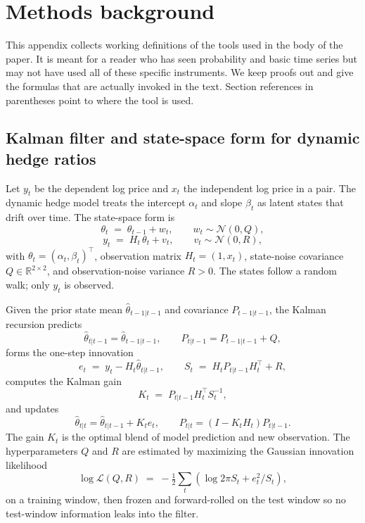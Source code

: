 \documentclass[11pt]{article}
\begin{document}
\appendix

\section{Methods background}
\label{sec:appendix}

This appendix collects working definitions of the tools used in the body of the paper. It
is meant for a reader who has seen probability and basic time series but may not have used
all of these specific instruments. We keep proofs out and give the formulas that are
actually invoked in the text. Section references in parentheses point to where the tool is
used.

\subsection{Kalman filter and state-space form for dynamic hedge ratios}
\label{app:kalman}

Let $y_t$ be the dependent log price and $x_t$ the independent log price in a pair. The
dynamic hedge model treats the intercept $\alpha_t$ and slope $\beta_t$ as latent states
that drift over time. The state-space form is
\[
\theta_t \;=\; \theta_{t-1} + w_t, \qquad w_t \sim \mathcal{N}(0, Q),
\]
\[
y_t \;=\; H_t \, \theta_t + v_t, \qquad v_t \sim \mathcal{N}(0, R),
\]
with $\theta_t = (\alpha_t, \beta_t)^\top$, observation matrix $H_t = (1, x_t)$, state-noise
covariance $Q \in \mathbb{R}^{2\times 2}$, and observation-noise variance $R > 0$. The
states follow a random walk; only $y_t$ is observed.

Given the prior state mean $\hat{\theta}_{t-1|t-1}$ and covariance $P_{t-1|t-1}$, the
Kalman recursion predicts
\[
\hat{\theta}_{t|t-1} = \hat{\theta}_{t-1|t-1}, \qquad P_{t|t-1} = P_{t-1|t-1} + Q,
\]
forms the one-step innovation
\[
e_t \;=\; y_t - H_t \hat{\theta}_{t|t-1}, \qquad S_t \;=\; H_t P_{t|t-1} H_t^\top + R,
\]
computes the Kalman gain
\[
K_t \;=\; P_{t|t-1} H_t^\top S_t^{-1},
\]
and updates
\[
\hat{\theta}_{t|t} = \hat{\theta}_{t|t-1} + K_t e_t, \qquad P_{t|t} = (I - K_t H_t) P_{t|t-1}.
\]
The gain $K_t$ is the optimal blend of model prediction and new observation. The
hyperparameters $Q$ and $R$ are estimated by maximizing the Gaussian innovation likelihood
\[
\log \mathcal{L}(Q, R) \;=\; -\tfrac{1}{2} \sum_{t} \left( \log 2\pi S_t + e_t^2 / S_t \right),
\]
on a training window, then frozen and forward-rolled on the test window so no test-window
information leaks into the filter.
\end{document}

